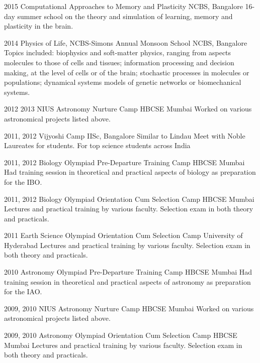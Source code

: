\documentclass[11pt]{friggeri-cv}%
\begin{document}
\begin{entrylist}
  \entryy
    {2015}
    {Computational Approaches to Memory and Plasticity }
    {NCBS, Bangalore}
    {16-day summer school on the theory and simulation of learning, memory and plasticity in the brain.}    
\end{entrylist}
\begin{entrylist}
  \entryy
    {2014}
    {Physics of Life, NCBS-Simons Annual Monsoon School}
    {NCBS, Bangalore}
    {Topics included: biophysics and soft-matter physics, ranging from aspects molecules to those of cells and tissues; information processing and decision making, at the level of cells or of the brain; stochastic processes in molecules or populations; dynamical systems models of genetic networks or biomechanical systems.}    
\end{entrylist}
\begin{entrylist}
  \entryy
    {2012 2013}
    {NIUS Astronomy Nurture Camp}
    {HBCSE Mumbai}
    {Worked on various astronomical projects listed above.}
\end{entrylist}
\begin{entrylist}
  \entryy
    {2011, 2012}
    {Vijyoshi Camp}
    {IISc, Bangalore}
    {Similar to Lindau Meet with Noble Laureates for students. For top  science students across India }
\end{entrylist}
\begin{entrylist}
  \entryy
    {2011, 2012}
    {Biology Olympiad Pre-Departure Training Camp}
    {HBCSE Mumbai}
    {Had training session in theoretical and practical aspects of biology as preparation for the IBO.}
\end{entrylist}
\begin{entrylist}
  \entryy
    {2011, 2012}
    {Biology Olympiad Orientation Cum Selection Camp}
    {HBCSE Mumbai}
    {Lectures and practical training by various faculty. Selection exam in both theory and practicals.}
\end{entrylist}
\begin{entrylist}
  \entryy
    {2011}
    {Earth Science Olympiad Orientation Cum Selection Camp}
    {University of Hyderabad}
    {Lectures and practical training by various faculty. Selection exam in both theory and practicals.}
\end{entrylist}
\begin{entrylist}
  \entryy
    {2010}
    {Astronomy Olympiad Pre-Departure Training Camp}
    {HBCSE Mumbai}
    {Had training session in theoretical and practical aspects of astronomy as preparation for the IAO.}
\end{entrylist}
\begin{entrylist}
  \entryy
    {2009, 2010}
    {NIUS Astronomy Nurture Camp}
    {HBCSE Mumbai}
    {Worked on various astronomical projects listed above.}
\end{entrylist}
\begin{entrylist}
  \entryy
    {2009, 2010}
    {Astronomy Olympiad Orientation Cum Selection Camp}
    {HBCSE Mumbai}
    {Lectures and practical training by various faculty. Selection exam in both theory and practicals.}
\end{entrylist}
\end{document}
